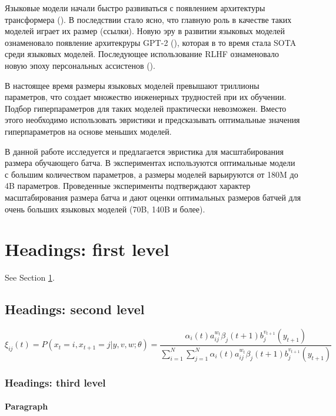 \documentclass{article}
\begin{document}
\quad Языковые модели начали быстро развиваться с появлением архитектуры трансформера (\cite{vaswani2017attention}). В последствии стало ясно, что главную роль в качестве таких моделей играет их размер (ссылки). Новую эру в развитии языковых  моделей ознаменовало появление архитекруры GPT-2 (\cite{radford2019language}), которая в то время стала SOTA среди языковых моделей. Последующее использование RLHF ознаменовало новую эпоху персональных ассистенов (\cite{ouyang2022training}).


\quad В настоящее время размеры языковых моделей превышают триллионы параметров, что создает множество инженерных трудностей при их обучении. Подбор гиперпараметров для таких моделей практически невозможен. Вместо этого необходимо использовать эвристики и предсказывать оптимальные значения гиперпараметров на основе меньших моделей.

\quad В данной работе исследуется и предлагается эвристика для масштабирования размера обучающего батча. В экспериментах используются оптимальные модели с большим количеством параметров, а размеры моделей варьируются от 180M до 4B параметров. Проведенные эксперименты подтверждают характер масштабирования размера батча и дают оценки оптимальных размеров батчей для очень больших языковых моделей (70B, 140B и более).


\section{Headings: first level}
\label{sec:headings}

\lipsum[4] See Section \ref{sec:headings}.

\subsection{Headings: second level}
\lipsum[5]
\begin{equation}
	\xi _{ij}(t)=P(x_{t}=i,x_{t+1}=j|y,v,w;\theta)= {\frac {\alpha _{i}(t)a^{w_t}_{ij}\beta _{j}(t+1)b^{v_{t+1}}_{j}(y_{t+1})}{\sum _{i=1}^{N} \sum _{j=1}^{N} \alpha _{i}(t)a^{w_t}_{ij}\beta _{j}(t+1)b^{v_{t+1}}_{j}(y_{t+1})}}
\end{equation}

\subsubsection{Headings: third level}
\lipsum[6]

\paragraph{Paragraph}
\lipsum[7]
\end{document}
